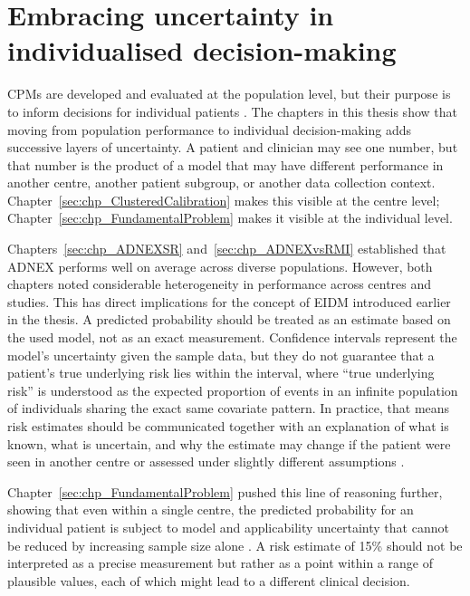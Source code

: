 \section{Embracing uncertainty in individualised decision-making}

\glspl{CPM} are developed and evaluated at the population level, but their purpose is to inform decisions for individual patients \cite{steyerbergClinicalPredictionModels2009}. The chapters in this thesis show that moving from population performance to individual decision-making adds successive layers of uncertainty. A patient and clinician may see one number, but that number is the product of a model that may have different performance in another centre, another patient subgroup, or another data collection context. Chapter~\ref{sec:chp_ClusteredCalibration} makes this visible at the centre level; Chapter~\ref{sec:chp_FundamentalProblem} makes it visible at the individual level. 

Chapters~\ref{sec:chp_ADNEXSR} and~\ref{sec:chp_ADNEXvsRMI} established that \gls{ADNEX} performs well on average across diverse populations. However, both chapters noted considerable heterogeneity in performance across centres and studies. This has direct implications for the concept of \gls{EIDM} introduced earlier in the thesis. A predicted probability should be treated as an estimate based on the used model, not as an exact measurement. Confidence intervals represent the model's uncertainty given the sample data, but they do not guarantee that a patient's true underlying risk lies within the interval, where \enquote{true underlying risk} is understood as the expected proportion of events in an infinite population of individuals sharing the exact same covariate pattern. In practice, that means risk estimates should be communicated together with an explanation of what is known, what is uncertain, and why the estimate may change if the patient were seen in another centre or assessed under slightly different assumptions \cite{pateUncertaintyUsingRisk2019, rileyUncertaintyRiskEstimates2025, aldermanTacklingAlgorithmicBias2025, ganapathiTacklingBiasAI2022}.

Chapter~\ref{sec:chp_FundamentalProblem} pushed this line of reasoning further, showing that even within a single centre, the predicted probability for an individual patient is subject to model and applicability uncertainty that cannot be reduced by increasing sample size alone \cite{pateUncertaintyUsingRisk2019, rileyUncertaintyRiskEstimates2025}. A risk estimate of 15\% should not be interpreted as a precise measurement but rather as a point within a range of plausible values, each of which might lead to a different clinical decision.

